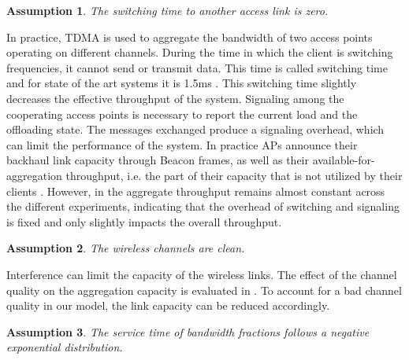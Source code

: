 \newtheorem{amp1}{Assumption}\label{amp:switching}
\begin{amp1}
	The switching time to another access link is zero.
\end{amp1}
In practice, TDMA is used to aggregate the bandwidth of two access points operating on different channels.
During the time in which the client is switching frequencies, it cannot send or transmit data. This time is called switching time and for state of the art systems it is 1.5ms \cite{goma2013patent}.
This switching time slightly decreases the effective throughput of the system.
Signaling among the cooperating access points is necessary to report the current load and the offloading state.
The messages exchanged produce a signaling overhead, which can limit the performance of the system.
In practice APs announce their backhaul link capacity through Beacon frames, as well as their available-for-aggregation throughput, i.e. the part of their capacity that is not utilized by their clients \cite{goma2013patent}.
However, in \cite{goma2013patent} the aggregate throughput remains almost constant across the different experiments, indicating that the overhead of switching and signaling is fixed and only slightly impacts the overall throughput.
\newtheorem{amp2}[amp1]{Assumption}\label{amp:aggrlimit}
\begin{amp2}
	The wireless channels are clean.
\end{amp2}
Interference can limit the capacity of the wireless links.
The effect of the channel quality on the aggregation capacity is evaluated in \cite{goma2013patent}.
To account for a bad channel quality in our model, the link capacity can be reduced accordingly.

\newtheorem{amp3}[amp1]{Assumption}\label{amp:servicetimes}
\begin{amp3}
	The service time of bandwidth fractions follows a negative exponential distribution.
\end{amp3}


